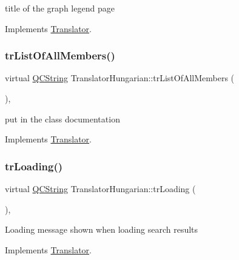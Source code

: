 title of the graph legend page 

Implements \mbox{\hyperlink{class_translator}{Translator}}.

\mbox{\label{class_translator_hungarian_a96ba3ac48998e3894d29a87b429f06c0}} 
\subsubsection{\texorpdfstring{trListOfAllMembers()}{trListOfAllMembers()}}
{\footnotesize\ttfamily virtual \mbox{\hyperlink{class_q_c_string}{Q\+C\+String}} Translator\+Hungarian\+::tr\+List\+Of\+All\+Members (\begin{DoxyParamCaption}{ }\end{DoxyParamCaption})\hspace{0.3cm}{\ttfamily [inline]}, {\ttfamily [virtual]}}

put in the class documentation 

Implements \mbox{\hyperlink{class_translator}{Translator}}.

\mbox{\label{class_translator_hungarian_a02e8fddb6e2847cb78efdf11ee750ea4}} 
\subsubsection{\texorpdfstring{trLoading()}{trLoading()}}
{\footnotesize\ttfamily virtual \mbox{\hyperlink{class_q_c_string}{Q\+C\+String}} Translator\+Hungarian\+::tr\+Loading (\begin{DoxyParamCaption}{ }\end{DoxyParamCaption})\hspace{0.3cm}{\ttfamily [inline]}, {\ttfamily [virtual]}}

Loading message shown when loading search results 

Implements \mbox{\hyperlink{class_translator}{Translator}}.

\mbox{\label{class_translator_hungarian_a49a8527f16cf50eb5375cdc55fece9f3}} 
